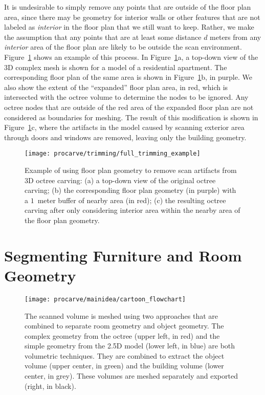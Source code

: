 \documentclass[12pt,onecolumn,oneside]{book}
\begin{document}
It is undesirable to simply remove any points that are outside of the floor plan area, since there may be geometry for interior walls or other features that are not labeled as {\it interior} in the floor plan that we still want to keep.  Rather, we make the assumption that any points that are at least some distance $d$ meters from any {\it interior} area of the floor plan are likely to be outside the scan environment.  Figure~\ref{fig:bloated_fp} shows an example of this process.  In Figure~\ref{fig:bloated_fp}a, a top-down view of the 3D complex mesh is shown for a model of a residential apartment.  The corresponding floor plan of the same area is shown in Figure~\ref{fig:bloated_fp}b, in purple.  We also show the extent of the ``expanded'' floor plan area, in red, which is intersected with the octree volume to determine the nodes to be ignored.  Any octree nodes that are outside of the red area of the expanded floor plan are not considered as boundaries for meshing.  The result of this modification is shown in Figure~\ref{fig:bloated_fp}c, where the artifacts in the model caused by scanning exterior area through doors and windows are removed, leaving only the building geometry.

\begin{figure}[p]

	\centering
	\centerline{\texttt{[image: procarve/trimming/full\_trimming\_example]}}
	
	\caption[Removing artifacts from octree carving with floor plans.]{Example of using floor plan geometry to remove scan artifacts from 3D octree carving:  (a) a top-down view of the original octree carving; (b) the corresponding floor plan geometry (in purple) with a $1$~meter buffer of nearby area (in red); (c) the resulting octree carving after only considering interior area within the nearby area of the floor plan geometry.}
	\label{fig:bloated_fp}

\end{figure}

\FloatBarrier
\section{Segmenting Furniture and Room Geometry}
\label{sec:procarve_main_idea}

\begin{figure}[t]
	\centerline{\texttt{[image: procarve/mainidea/cartoon\_flowchart]}}
	\caption[Diagram showing how models are used to segment objects in scene.]{The scanned volume is meshed using two approaches that are combined to separate room geometry and object geometry.  The complex geometry from the octree (upper left, in red) and the simple geometry from the 2.5D model (lower left, in blue) are both volumetric techniques.  They are combined to extract the object volume (upper center, in green) and the building volume (lower center, in grey).  These volumes are meshed separately and exported (right, in black).}
	\label{fig:procarve_mainidea}
\end{figure}
\end{document}
